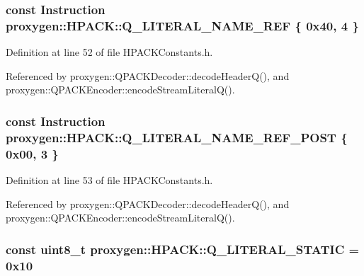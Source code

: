 \subsubsection[{Q\+\_\+\+L\+I\+T\+E\+R\+A\+L\+\_\+\+N\+A\+M\+E\+\_\+\+R\+EF}]{\setlength{\rightskip}{0pt plus 5cm}const {\bf Instruction} proxygen\+::\+H\+P\+A\+C\+K\+::\+Q\+\_\+\+L\+I\+T\+E\+R\+A\+L\+\_\+\+N\+A\+M\+E\+\_\+\+R\+EF \{ 0x40, 4 \}}\label{namespaceproxygen_1_1HPACK_a9715f3b3c8662b7a7569a6e67114717d}


Definition at line 52 of file H\+P\+A\+C\+K\+Constants.\+h.



Referenced by proxygen\+::\+Q\+P\+A\+C\+K\+Decoder\+::decode\+Header\+Q(), and proxygen\+::\+Q\+P\+A\+C\+K\+Encoder\+::encode\+Stream\+Literal\+Q().

\subsubsection[{Q\+\_\+\+L\+I\+T\+E\+R\+A\+L\+\_\+\+N\+A\+M\+E\+\_\+\+R\+E\+F\+\_\+\+P\+O\+ST}]{\setlength{\rightskip}{0pt plus 5cm}const {\bf Instruction} proxygen\+::\+H\+P\+A\+C\+K\+::\+Q\+\_\+\+L\+I\+T\+E\+R\+A\+L\+\_\+\+N\+A\+M\+E\+\_\+\+R\+E\+F\+\_\+\+P\+O\+ST \{ 0x00, 3 \}}\label{namespaceproxygen_1_1HPACK_aa40dce12ec94509411a46df13a97eead}


Definition at line 53 of file H\+P\+A\+C\+K\+Constants.\+h.



Referenced by proxygen\+::\+Q\+P\+A\+C\+K\+Decoder\+::decode\+Header\+Q(), and proxygen\+::\+Q\+P\+A\+C\+K\+Encoder\+::encode\+Stream\+Literal\+Q().

\subsubsection[{Q\+\_\+\+L\+I\+T\+E\+R\+A\+L\+\_\+\+S\+T\+A\+T\+IC}]{\setlength{\rightskip}{0pt plus 5cm}const uint8\+\_\+t proxygen\+::\+H\+P\+A\+C\+K\+::\+Q\+\_\+\+L\+I\+T\+E\+R\+A\+L\+\_\+\+S\+T\+A\+T\+IC = 0x10}\label{namespaceproxygen_1_1HPACK_a37b0cc1bb644c51ddd88fa6b004d8791}


